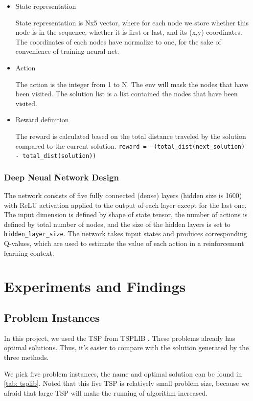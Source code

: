 \documentclass[twocolumn, a4paper]{extarticle}
\begin{document}
\begin{itemize}
	\item State representation
	
	State representation is Nx5 vector, where for each node we store whether this node is in the sequence, whether it is first or last, and its (x,y) coordinates. The coordinates of each nodes have normalize to one, for the sake of convenience of training neural net.
	\item Action
	
	The action is the integer from 1 to N. The env will mask the nodes that have been visited. The solution list is a list contained the nodes that have been visited.
	\item Reward definition
	
	The reward is calculated based on the total distance traveled by the solution compared to the current solution. \texttt{reward = -(total\_dist(next\_solution) - total\_dist(solution))}

\end{itemize}

\subsubsection{Deep Neual Network Design}
The network consists of five fully connected (dense) layers (hidden size is 1600) with ReLU activation applied to the output of each layer except for the last one. The input dimension is defined by shape of state tensor, the number of actions is defined by total number of nodes, and the size of the hidden layers is set to \texttt{hidden\_layer\_size}. The network takes input states and produces corresponding Q-values, which are used to estimate the value of each action in a reinforcement learning context.


\section{Experiments and Findings}

\subsection{Problem Instances}

In this project, we used the TSP from TSPLIB \cite{reinelt1991tsplib}. These problems already has optimal solutions. Thus, it's easier to compare with the solution generated by the three methods.

We pick five problem instances, the name and optimal solution can be found in \autoref{tab: tsplib}. Noted that this five TSP is relatively small problem size, because we afraid that large TSP will make the running of algorithm increased.
\end{document}
